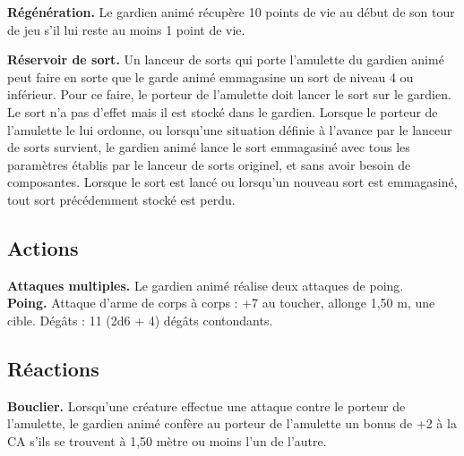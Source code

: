 \begin{figure*}[hbp]
{\begin{minipage}[c]{.45\linewidth}
    {\bfseries Régénération.} Le gardien animé récupère 10 points de vie au début de son tour de jeu s'il 
               lui reste au moins 1 point de vie.
  \end{minipage}
  \hspace{4pt}
  \begin{minipage}[c]{.45\linewidth}
    {\bfseries Réservoir de sort.} Un lanceur de sorts qui porte l'amulette du gardien animé peut faire en 
               sorte que le garde animé emmagasine un sort de niveau 4 ou inférieur. Pour ce faire, le 
               porteur de l'amulette doit lancer le sort sur le gardien. Le sort n'a pas d'effet mais il 
               est stocké dans le gardien. Lorsque le porteur de l'amulette le lui ordonne, ou lorsqu'une 
               situation définie à l'avance par le lanceur de sorts survient, le gardien animé lance le 
               sort emmagasiné avec tous les paramètres établis par le lanceur de sorts originel, et sans 
               avoir besoin de composantes. Lorsque le sort est lancé ou lorsqu'un nouveau sort est 
               emmagasiné, tout sort précédemment stocké est perdu.
    \vspace{-10pt}
    \subsection*{Actions}
    {\bfseries Attaques multiples.} Le  gardien animé réalise deux attaques de poing.\\
    {\bfseries Poing.} Attaque d'arme de corps à corps : +7 au toucher, allonge 1,50 m, une cible. 
               Dégâts : 11 (2d6 + 4) dégâts contondants.
    \vspace{-10pt}
    \subsection*{Réactions}
    {\bfseries Bouclier.} Lorsqu'une créature effectue une attaque contre le porteur de l'amulette, le 
               gardien animé confère au porteur de l'amulette un bonus de +2 à la CA s'ils se trouvent à 
               1,50 mètre ou moins l'un de l'autre.
  \end{minipage}
}%
\end{figure*}

